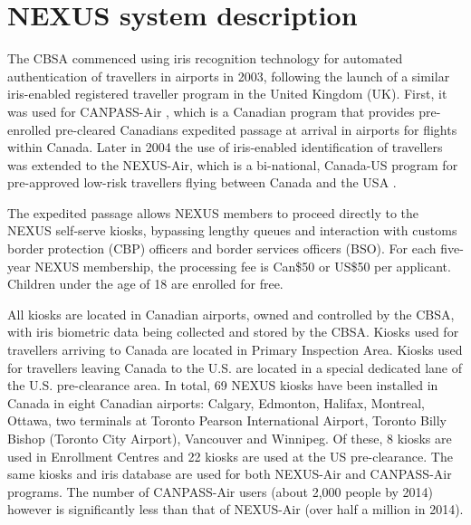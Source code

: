 \documentclass{cta-author}%
\begin{document}
\section{NEXUS system description}
\label{s.description}

The CBSA commenced using iris recognition technology for automated authentication of travellers in airports in 2003, following the launch of a similar iris-enabled registered traveller program in the United Kingdom (UK). First,   it was used for CANPASS-Air \cite{[kn:CANPASS]}, which is a Canadian program that provides pre-enrolled pre-cleared Canadians expedited passage at arrival in airports for flights within Canada. Later in 2004 the use of iris-enabled identification of travellers was extended to the NEXUS-Air, which is a bi-national, Canada-US program for pre-approved low-risk travellers flying between Canada and the USA \cite{[CBSA-NEXUS]}. 

The expedited passage allows NEXUS members to proceed directly to the NEXUS self-serve kiosks, bypassing lengthy queues and interaction with customs border protection (CBP) officers and border services officers (BSO). For each five-year NEXUS membership, the processing fee is Can\$50 or US\$50 per applicant. Children under the age of 18 are enrolled for free.

All kiosks are located in Canadian airports, owned and controlled by the CBSA, with iris biometric data being collected and stored by the CBSA. 
Kiosks used for travellers arriving to Canada are located in Primary Inspection Area.
Kiosks used for travellers leaving Canada to the U.S. are located in a special dedicated lane of the U.S. pre-clearance area. 
In total, 69 NEXUS kiosks have been installed in Canada in eight Canadian airports: Calgary, Edmonton, Halifax, Montreal, Ottawa, two terminals at Toronto Pearson International Airport, Toronto Billy Bishop (Toronto City Airport), Vancouver and Winnipeg. Of these, 8 kiosks are used in Enrollment Centres and 22 kiosks are used at the US pre-clearance.
The same kiosks and iris database are used for both NEXUS-Air and CANPASS-Air programs. 
The number of CANPASS-Air users (about 2,000 people by 2014) however is significantly less than that of NEXUS-Air (over half a million in 2014).


\end{document}
